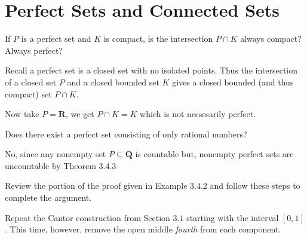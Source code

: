 \section{Perfect Sets and Connected Sets}

\begin{exercise}
  If $P$ is a perfect set and $K$ is compact, is the intersection $P \cap K$ always compact? Always perfect?
\end{exercise}

\begin{solution}
  Recall a perfect set is a closed set with no isolated points. Thus the intersection of a closed set $P$ and a closed bounded set $K$ gives a closed bounded (and thus compact) set $P \cap K$.

  Now take $P = \mathbf{R}$, we get $P \cap K = K$ which is not nessesarily perfect.
\end{solution}

\begin{exercise}
  Does there exist a perfect set consisting of only rational numbers?
\end{exercise}

\begin{solution}
  No, since any nonempty set $P \subseteq \mathbf Q$ is countable but, nonempty perfect sets are uncountable by Theorem 3.4.3
\end{solution}

\begin{exercise}
  Review the portion of the proof given in Example 3.4.2 and follow these steps to complete the argument.
\end{exercise}

\begin{solution}
  \enum{
  \item \TODO
  \item \TODO
  }
\end{solution}

\begin{exercise}
  Repeat the Cantor construction from Section $3.1$ starting with the interval $[0,1]$. This time, however, remove the open middle \emph{fourth} from each component.
\end{exercise}

